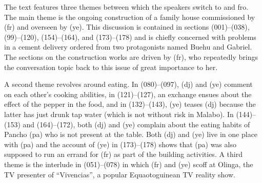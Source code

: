 The text features three themes between which the speakers switch to and fro. The main theme is the ongoing construction of a family house commissioned by (fr) and overseen by (ye). This discussion is contained in sections (001)–(038), (99)–(120), (154)–(164), and (173)–(178) and is chiefly concerned with problems in a cement delivery ordered from two protagonists named Buehu and Gabriel. The sections on the construction works are driven by (fr), who repeatedly brings the conversation topic back to this issue of great importance to her.



A second theme revolves around eating. In (080)–(097), (dj) and (ye) comment on each other’s cooking abilities, in (121)–(127), an exchange ensues about the effect of the pepper in the food, and in (132)–(143), (ye) teases (dj) because the latter has just drunk tap water (which is not without risk in Malabo). In (144)–(153) and (164)–(172), both (dj) and (ye) complain about the eating habits of Pancho (pa) who is not present at the table. Both (dj) and (ye) live in one place with (pa) and the account of (ye) in (173)–(178) shows that (pa) was also supposed to run an errand for (fr) as part of the building activities. A third theme is the interlude in (051)–(078) in which (fr) and (ye) scoff at Olinga, the TV presenter of “Vivencias”, a popular Equaotoguinean TV reality show.

\setcounter{equation}{0}  %

